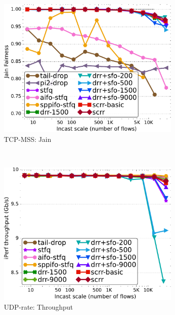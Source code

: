 \begin{figure}[th!]
\begin{subfigure}[t]{.30\linewidth}
    \centering
    \includegraphics[width=0.95\linewidth]{figs/paral_cn_6t4x1024_mss_2500_jain_comp_methods.pdf}
    \caption{TCP-MSS: Jain}
    \label{fig:fairness-jain-tcp-mss-full}
  \end{subfigure}
  \\
  \begin{subfigure}[t]{.30\linewidth}
    \centering
    \includegraphics[width=0.95\linewidth]{figs/paral_cn_6u4x1024_Cb_7G_bw_comp_methods.pdf}
    \caption{UDP-rate: Throughput}
    \label{fig:fairness-tput-udp-rate-full}
  \end{subfigure}
  \begin{subfigure}[t]{.30\linewidth}
    \centering

\end{subfigure}
\end{figure}
